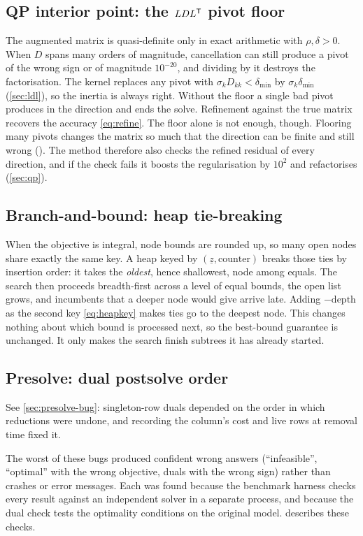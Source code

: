 \subsection{QP interior point: the \texorpdfstring{$LDL^{\mathsf{T}}$}{LDLT} pivot floor}
The augmented matrix is quasi-definite only in exact arithmetic with $\rho,\delta>0$. When $D$
spans many orders of magnitude, cancellation can still produce a pivot of the wrong sign or of
magnitude $10^{-20}$, and dividing by it destroys the factorisation. The kernel replaces any pivot with
$\sigma_kD_{kk}<\delta_{\min}$ by $\sigma_k\delta_{\min}$ (\cref{sec:ldl}), so the inertia is always
right. Without the floor a single bad pivot produces  in the direction and ends the solve.
Refinement against the true matrix recovers the accuracy \eqref{eq:refine}. The floor alone is not
enough, though. Flooring many pivots changes the matrix so much that the direction can be finite and
still wrong (). The method therefore also checks the refined residual of every direction,
and if the check fails it boosts the regularisation by $10^2$ and refactorises (\cref{sec:qp}).

\subsection{Branch-and-bound: heap tie-breaking}\label{sec:heap}
When the objective is integral, node bounds are rounded up, so many open nodes share exactly the
same key. A heap keyed by $(\underline z,\text{counter})$ breaks those ties by insertion order: it
takes the \emph{oldest}, hence shallowest, node among equals. The search then proceeds breadth-first
across a level of equal bounds, the open list grows, and incumbents that a deeper node would give
arrive late. Adding $-\text{depth}$ as the second key \eqref{eq:heapkey} makes ties go to the deepest
node. This changes nothing about which bound is processed next, so the best-bound guarantee is
unchanged. It only makes the search finish subtrees it has already started.

\subsection{Presolve: dual postsolve order}
See \cref{sec:presolve-bug}: singleton-row duals depended on the order in which reductions were
undone, and recording the column's cost and live rows at removal time fixed it.

\begin{lessonbox}
The worst of these bugs produced confident wrong answers (``infeasible'', ``optimal'' with the wrong
objective, duals with the wrong sign) rather than crashes or error messages. Each was found because the benchmark
harness checks every result against an independent solver in a separate process, and because the dual
check tests the optimality conditions on the original model.  describes these
checks.
\end{lessonbox}
